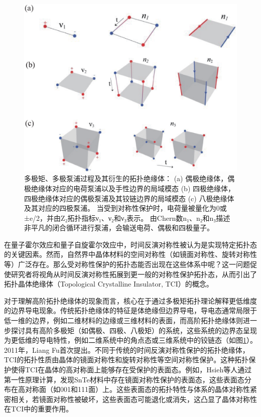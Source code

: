 \begin{figure}[h!]
    \centering
    \includegraphics[width=1\textwidth]{images/fig1-4.eps} 
    \caption{多极矩、多极泵浦过程及其衍生的拓扑绝缘体：
    (a) 偶极绝缘体，偶极绝缘体对应的电荷泵浦以及手性边界的局域模态
    (b) 四极绝缘体，四极绝缘体对应的偶极泵浦及其铰链边界的局域模态
    (c) 八极绝缘体及其对应的四极泵浦。
    当受到对称性保护时，电荷量被量化为0或±e/2，并由Z₂拓扑指标ν₁、ν₂和ν₃表示。
    由Chern数n₁、n₂和n₃描述非平凡的闭合循环进行泵浦，会输送电荷、偶极和四极量子\cite{f6}。
    }
    \label{fig_1_4}
\end{figure}

在量子霍尔效应和量子自旋霍尔效应中，时间反演对称性被认为是实现特定拓扑态的关键因素。然而，自然界中晶体材料的空间对称性（如镜面对称性、旋转对称性等）广泛存在。那么受对称性保护的拓扑态能否出现在这些体系中呢？这一问题促使研究者将视角从时间反演对称性拓展到更一般的对称性保护拓扑态，从而引出了拓扑晶体绝缘体（Topological Crystalline Insulator, TCI）的概念。

对于理解高阶拓扑绝缘体的现象而言，核心在于通过多极矩拓扑理论解释更低维度的边界导电现象。传统拓扑绝缘体的特征是体绝缘但边界导电，导电态通常局限于低一维的边界，例如二维材料的边缘或三维材料的表面，而高阶拓扑绝缘体则进一步探讨具有高阶多极矩（如偶极、四极、八极矩）的系统，这些系统的边界态呈现为更低维的导电特性，例如二维系统中的角点态或三维系统中的铰链态（如图\ref{fig_1_4}）。2011年，Liang Fu首次提出\cite{f1}。不同于传统的时间反演对称性保护的拓扑绝缘体，TCI的拓扑性质由晶体的镜面对称性和旋转对称性等空间对称性保护。这种拓扑保护使得TCI在晶体的高对称面上能够存在受保护的表面态。例如，Hsieh等人通过第一性原理计算，发现SnTe材料中存在镜面对称性保护的表面态，这些表面态分布在高对称面（如{001}和{111}面）上\cite{f2}。这些表面态的拓扑特性与体系的晶体对称性紧密相关，若镜面对称性被破坏，这些表面态可能退化或消失，这凸显了晶体对称性在TCI中的重要作用。


